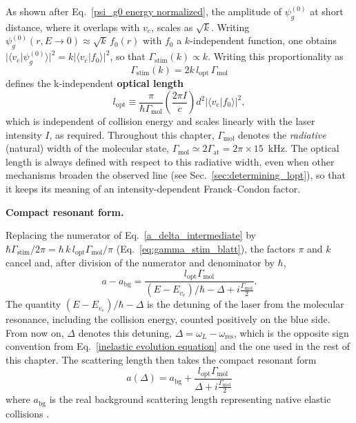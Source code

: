 As shown after Eq.~\ref{psi_g0 energy normalized}, the amplitude of
$\psi_g^{(0)}$ at short distance, where it overlaps with $v_e$, scales as
$\sqrt{k}$. Writing $\psi_g^{(0)}(r,E\to0)\approx\sqrt{k}\,f_0(r)$ with $f_0$ a
$k$-independent function, one obtains
$\vert\langle v_e\vert\psi_g^{(0)}\rangle\vert^2=k\vert\langle v_e\vert
f_0\rangle\vert^2$, so that $\Gamma_{\text{stim}}(k)\propto k$. Writing this
proportionality as \cite{yan_controlling_2013}
\begin{equation}
    \Gamma_{\text{stim}}(k) = 2 k\,l_{\text{opt}}\,\Gamma_{\text{mol}}
    \label{eq:gamma_stim_blatt}
\end{equation}
defines the k-independent \textbf{optical length}
\begin{equation}
    l_{\text{opt}} \equiv \frac{\pi}{\hbar\Gamma_{\text{mol}}}\left(\frac{2\pi I}{c}\right)d^2\left\vert\langle v_e\vert f_0\rangle\right\vert^2,
    \label{lopt_def}
\end{equation}
which is independent of collision energy and scales linearly with the laser
intensity $I$, as required. Throughout this chapter, $\Gamma_{\text{mol}}$ denotes
the \textit{radiative} (natural) width of the molecular state,
$\Gamma_{\text{mol}} \simeq 2\Gamma_{\text{at}} = 2\pi\times15$~kHz. The optical
length is always defined with respect to this radiative width, even when other
mechanisms broaden the observed line (see Sec.~\ref{sec:determining_lopt}), so
that it keeps its meaning of an intensity-dependent Franck--Condon factor.

\textbf{Compact resonant form.}

Replacing the numerator of Eq.~\ref{a_delta_intermediate} by
$\hbar\Gamma_{\text{stim}}/2\pi=\hbar\,k\,l_{\text{opt}}\Gamma_{\text{mol}}/\pi$
(Eq.~\ref{eq:gamma_stim_blatt}), the factors $\pi$ and $k$ cancel and, after division
of the numerator and denominator by $\hbar$,
$$a-a_{\text{bg}}=\frac{l_{\text{opt}}\Gamma_{\text{mol}}}
{(E-E_{v_e})/\hbar-\Delta+i\frac{\Gamma_{\text{mol}}}{2}}.$$
The quantity $(E-E_{v_e})/\hbar-\Delta$ is the detuning of the laser from the molecular
resonance, including the collision energy, counted positively on the blue side. From
now on, $\Delta$ denotes this detuning, $\Delta=\omega_L-\omega_{\text{res}}$, which is
the opposite sign convention from Eq.~\ref{inelastic evolution equation} and the one
used in the rest of this chapter. The scattering length then takes the compact
resonant form
\begin{equation}
a(\Delta) = a_{\text{bg}} + \frac{l_{\text{opt}}\Gamma_{\text{mol}}}{\Delta + i\frac{\Gamma_{\text{mol}}}{2}}
\label{a(delta)}
\end{equation}
where $a_{\text{bg}}$ is the real background scattering length representing native elastic collisions \cite{yan_controlling_2013}.

